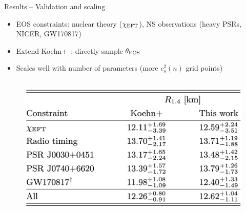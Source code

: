 \documentclass[usenames,dvipsnames,t]{beamer}
\begin{document}
\begin{frame}{Results -- Validation and scaling}

  \def\x{2mm}
  \def\y{3mm}

  \begin{itemize}
    \item EOS constraints: nuclear theory ($\chi_{\rm{EFT}}$), NS observations (heavy PSRs, NICER, GW170817)

    \vspace{\y}

    \item Extend Koehn+~\cite{Koehn:2024set}: directly sample $\theta_{\rm{EOS}}$

    \vspace{\y}

    \item Scales well with number of parameters (more $c_s^2(n)$ grid points)
  \end{itemize}

  \vspace{\x}

  \begin{columns}


    \begin{figure}[htpb]
      \centering
      \includegraphics[width=0.975\linewidth]{Figures/R14_table.jpg}
    \end{figure}


\end{columns}
\end{frame}
\end{document}
